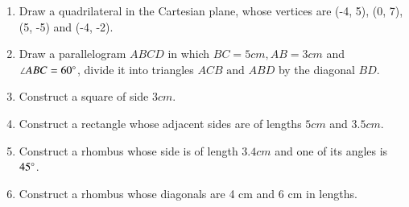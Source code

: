 \begin{enumerate}[label=\thesubsection.\arabic*,ref=\thesubsection.\theenumi]
	\item Draw a quadrilateral in the Cartesian plane, whose vertices are (-4, 5), (0, 7), (5, -5) and (-4, -2). 
\item Draw a parallelogram ${ABCD}$ in which $BC=5 cm, AB=3 cm$ and $\angle{ABC}=60\degree$, divide it into triangles ${ACB}\text{ and }{ABD}$ by the diagonal $BD$. 
\item Construct a square of side $3 cm$.
\item Construct  a rectangle whose adjacent sides are of lengths $5 cm$ and $3.5 cm$.
\item Construct a rhombus whose side is of length $3.4 cm$ and one of its angles is $45\degree$.
\item Construct a rhombus whose diagonals are 4 cm and 6 cm in lengths.
\end{enumerate}
